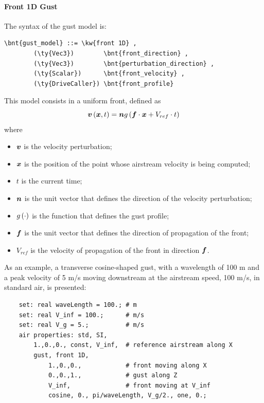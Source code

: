 \paragraph{Front 1D Gust}
The syntax of the  gust model is:
\begin{Verbatim}[commandchars=\\\{\}]
    \bnt{gust_model} ::= \kw{front 1D} ,
        (\ty{Vec3})        \bnt{front_direction} ,
        (\ty{Vec3})        \bnt{perturbation_direction} ,
        (\ty{Scalar})      \bnt{front_velocity} ,
        (\ty{DriveCaller}) \bnt{front_profile}
\end{Verbatim}
This model consists in a uniform front, defined as
\begin{displaymath}
	\boldsymbol{v}\left( \boldsymbol{x}, t \right) = \boldsymbol{n} g\left( \boldsymbol{f} \cdot \boldsymbol{x} + V_{ref} \cdot t \right)
\end{displaymath}
where
\begin{itemize}
\item $\boldsymbol{v}$ is the velocity perturbation;
\item $\boldsymbol{x}$ is the position of the point whose airstream velocity
is being computed;
\item $t$ is the current time;
\item $\boldsymbol{n}$ is the unit vector  
that defines the direction of the velocity perturbation;
\item $g\left( \cdot \right)$ is the function  
that defines the gust profile;
\item $\boldsymbol{f}$ is the unit vector  
that defines the direction of propagation of the front;
\item $V_{ref}$ is the velocity  
of propagation of the front in direction $\boldsymbol{f}$.
\end{itemize}
As an example, a transverse cosine-shaped gust, with a wavelength of 100 m
and a peak velocity of 5 m/s moving downstream at the airstream speed,
100 m/s, in standard air, is presented:
\begin{verbatim}
    set: real waveLength = 100.; # m
    set: real V_inf = 100.;      # m/s
    set: real V_g = 5.;          # m/s
    air properties: std, SI,
        1.,0.,0., const, V_inf,  # reference airstream along X
        gust, front 1D,
            1.,0.,0.,            # front moving along X
            0.,0.,1.,            # gust along Z
            V_inf,               # front moving at V_inf
            cosine, 0., pi/waveLength, V_g/2., one, 0.;
\end{verbatim}



